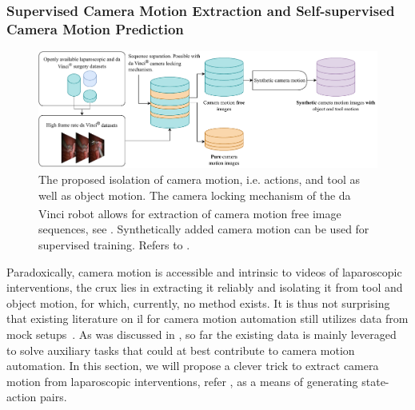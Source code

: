 \subsubsection{Supervised Camera Motion Extraction and Self-supervised Camera Motion Prediction}
\label{in:sec:supervised_self_supervised}
\begin{figure}[tb]
    \centering
    \includegraphics[width=\textwidth]{introduction/fig/camera_motion.pdf}
    \caption{The proposed isolation of camera motion, i.e. actions, and tool as well as object motion. The camera locking mechanism of the da Vinci\textsuperscript{\textregistered} robot allows for extraction of camera motion free image sequences, see . Synthetically added camera motion can be used for supervised training. Refers to .}
    \label{in:fig:camera_motion}
\end{figure}
Paradoxically, camera motion is accessible and intrinsic to videos of laparoscopic interventions, the crux lies in extracting it reliably and isolating it from tool and object motion, for which, currently, no method exists. It is thus not surprising that existing literature on \gls{il} for camera motion automation still utilizes data from mock setups~\cite{ji2018learning,wagner2021learning}. As was discussed in , so far the existing data is mainly leveraged to solve auxiliary tasks that could at best contribute to camera motion automation. In this section, we will propose a clever trick to extract camera motion from laparoscopic interventions, refer , as a means of generating state-action pairs.

